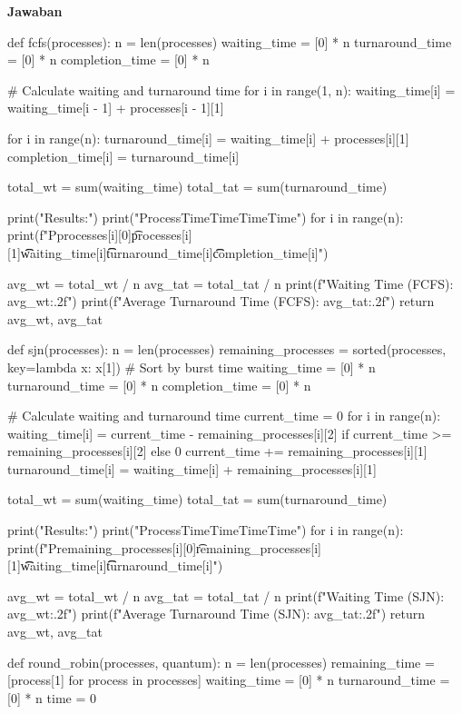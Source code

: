 \documentclass[12pt]{article}
\begin{document}
\textbf{Jawaban}
\begin{python}
    def fcfs(processes):
    n = len(processes)
    waiting_time = [0] * n
    turnaround_time = [0] * n
    completion_time = [0] * n
    
    # Calculate waiting and turnaround time
    for i in range(1, n):
        waiting_time[i] = waiting_time[i - 1] + processes[i - 1][1]
    
    for i in range(n):
        turnaround_time[i] = waiting_time[i] + processes[i][1]
        completion_time[i] = turnaround_time[i]
    
    total_wt = sum(waiting_time)
    total_tat = sum(turnaround_time)
    
    print("\nFCFS Results:")
    print("Process\tBurst Time\tWaiting Time\tTurnaround Time\tCompletion Time")
    for i in range(n):
        print(f"P{processes[i][0]}\t{processes[i][1]}\t\t{waiting_time[i]}\t\t{turnaround_time[i]}\t\t{completion_time[i]}")
    
    avg_wt = total_wt / n
    avg_tat = total_tat / n
    print(f"\nAverage Waiting Time (FCFS): {avg_wt:.2f}")
    print(f"Average Turnaround Time (FCFS): {avg_tat:.2f}")
    return avg_wt, avg_tat

def sjn(processes):
    n = len(processes)
    remaining_processes = sorted(processes, key=lambda x: x[1])  # Sort by burst time
    waiting_time = [0] * n
    turnaround_time = [0] * n
    completion_time = [0] * n
    
    # Calculate waiting and turnaround time
    current_time = 0
    for i in range(n):
        waiting_time[i] = current_time - remaining_processes[i][2] if current_time >= remaining_processes[i][2] else 0
        current_time += remaining_processes[i][1]
        turnaround_time[i] = waiting_time[i] + remaining_processes[i][1]
    
    total_wt = sum(waiting_time)
    total_tat = sum(turnaround_time)
    
    print("\nSJN Results:")
    print("Process\tBurst Time\tWaiting Time\tTurnaround Time\tCompletion Time")
    for i in range(n):
        print(f"P{remaining_processes[i][0]}\t{remaining_processes[i][1]}\t\t{waiting_time[i]}\t\t{turnaround_time[i]}")
    
    avg_wt = total_wt / n
    avg_tat = total_tat / n
    print(f"\nAverage Waiting Time (SJN): {avg_wt:.2f}")
    print(f"Average Turnaround Time (SJN): {avg_tat:.2f}")
    return avg_wt, avg_tat

def round_robin(processes, quantum):
    n = len(processes)
    remaining_time = [process[1] for process in processes]
    waiting_time = [0] * n
    turnaround_time = [0] * n
    time = 0
    

\end{python}
\end{document}

